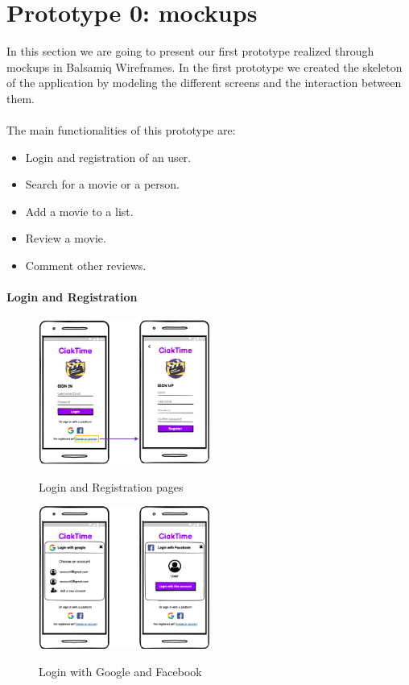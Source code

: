 \documentclass[12pt, a4paper]{article}
\numberwithin{figure}{section}
\begin{document}

\newpage

\section{Prototype 0: mockups}
In this section we are going to present our first prototype realized through mockups
in Balsamiq Wireframes. In the first prototype we created the skeleton of the application
by modeling the different screens and the interaction between them.\\\\
The main functionalities of this prototype are:
\begin{itemize}
	\item Login and registration of an user.
	\item Search for a movie or a person.
	\item Add a movie to a list.
	\item Review a movie.
	\item Comment other reviews.
\end{itemize}

\paragraph{Login and Registration}
\mbox{}
\begin{figure}[H]
	\centering
	\includegraphics[width=0.5\textwidth]{images/mockups/signInSignUp.png}\\
	\caption{Login and Registration pages}
\end{figure}
\begin{figure}[H]
	\centering
	\includegraphics[width=0.5\textwidth]{images/mockups/loginSocial.png}\\
	\caption{Login with Google and Facebook}
\end{figure}
\end{document}
